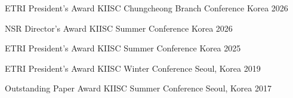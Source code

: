 

\begin{cvhonors}

  \cvhonor
    {ETRI President's Award}
    {KIISC Chungcheong Branch Conference}
    {Korea}
    {2026}

  \cvhonor
    {NSR Director's Award}
    {KIISC Summer Conference}
    {Korea}
    {2026}

  \cvhonor
    {ETRI President's Award}
    {KIISC Summer Conference}
    {Korea}
    {2025}

  \cvhonor
    {ETRI President's Award}
    {KIISC Winter Conference}
    {Seoul, Korea}
    {2019}

  \cvhonor
    {Outstanding Paper Award}
    {KIISC Summer Conference}
    {Seoul, Korea}
    {2017}

\end{cvhonors}

